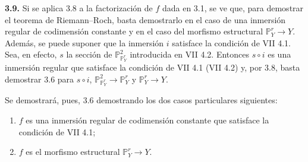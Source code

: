 \textbf{3.9.} Si se aplica 3.8 a la factorización de \(f\) dada en 3.1, se ve
que, para demostrar el teorema de Riemann--Roch, basta demostrarlo en el caso
de una inmersión regular de codimensión constante y en el caso del morfismo
estructural $\mathbb P^r_Y\longrightarrow Y$.
Además, se puede suponer que la inmersión \(i\) satisface la condición de VII
4.1. Sea, en efecto, \(s\) la sección de \(\mathbb P^2_{\mathbb P^r_Y}\)
introducida en VII 4.2. Entonces \(s\circ i\) es una inmersión regular que
satisface la condición de VII 4.1 (VII 4.2) y, por 3.8, basta demostrar 3.6 para
\(s\circ i\), \(\mathbb P^2_{\mathbb P^r_Y}\longrightarrow\mathbb P^r_Y\) y
\(\mathbb P^r_Y\longrightarrow Y\).

Se demostrará, pues, 3.6 demostrando los dos casos particulares siguientes:
\begin{enumerate}[label=\roman*)]
\item \(f\) es una inmersión regular de codimensión constante que satisface la
condición de VII 4.1;
\item \(f\) es el morfismo estructural \(\mathbb P^r_Y\to Y\).
\end{enumerate}
